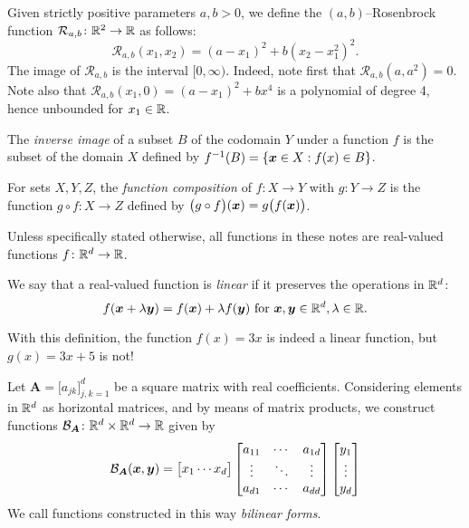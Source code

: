 \begin{example}\label{example:Rosenbrock2}
Given strictly positive parameters $a,b > 0$, we define the $(a,b)$--Rosenbrock function $\mathcal{R}_{a,b}\colon \mathbb{R}^2 \to \mathbb{R}$ as follows:
\begin{equation*} 
\mathcal{R}_{a,b}(x_1, x_2) = (a-x_1)^2 + b(x_2-x_1^2)^2.
\end{equation*}
The image of $\mathcal{R}_{a,b}$ is the interval $[0,\infty)$.  Indeed, note first that $\mathcal{R}_{a,b} (a,a^2) = 0$.  Note also that $\mathcal{R}_{a,b}(x_1,0) = (a-x_1)^2 + bx^4$ is a polynomial of degree 4, hence unbounded for $x_1 \in \mathbb{R}$.
\end{example}

The \emph{inverse image} of a subset $B$ of the codomain $Y$ under a function $f$ is the subset of the domain $X$ defined by $f^{-1}(B) = \{ \boldsymbol{x} \in X : f(x) \in B\}$.

For sets $X, Y, Z$, the \emph{function composition} of $f\colon X \to Y$ with $g\colon Y \to Z$ is the function $g\circ f\colon X \to Z$ defined by $\big( g \circ f \big)(\boldsymbol{x}) = g \big( f(\boldsymbol{x}) \big)$.

Unless specifically stated otherwise, all functions in these notes are real-valued functions $f \colon \mathbb{R}^d \to \mathbb{R}$.

\begin{example}\label{example:linearFunction}
We say that a real-valued function is \emph{linear} if it preserves the operations in $\mathbb{R}^d$: 
\begin{equation*}
f(\boldsymbol{x} + \lambda \boldsymbol{y}) = f(\boldsymbol{x}) + \lambda f(\boldsymbol{y}) \text{ for }\boldsymbol{x}, \boldsymbol{y} \in \mathbb{R}^d, \lambda \in \mathbb{R}.
\end{equation*}

With this definition, the function $f(x) = 3x$ is indeed a linear function, but $g(x)=3x+5$ is not!  
\end{example}

\begin{example}\label{example:BilinearForm}
Let $\boldsymbol{A} = \big[ a_{jk} \big]_{j,k=1}^d$ be a square matrix with real coefficients.  Considering elements in $\mathbb{R}^d$ as horizontal matrices, and by means of matrix products, we construct functions $\mathcal{B}_{\boldsymbol{A}} \colon \mathbb{R}^d \times \mathbb{R}^d \to \mathbb{R}$ given by
\begin{equation*}
\mathcal{B}_{\boldsymbol{A}}(\boldsymbol{x}, \boldsymbol{y}) = \begin{bmatrix} x_1 \dotsb x_d \end{bmatrix} \begin{bmatrix} a_{11} &\dotsb &a_{1d} \\ \vdots & \ddots & \vdots \\ a_{d1} &\dotsb &a_{dd} \end{bmatrix} \begin{bmatrix} y_1 \\ \vdots \\ y_d \end{bmatrix}
\end{equation*}
We call functions constructed in this way \emph{bilinear forms}.
\end{example}


